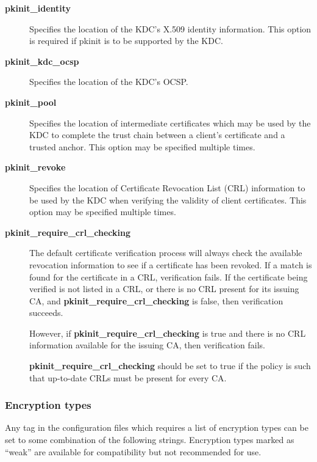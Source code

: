 \documentclass[letterpaper,10pt,english]{sphinxmanual}
\begin{document}
\begin{description}
\begin{description}
\end{description}

\item[{\textbf{pkinit\_identity}}] \leavevmode
Specifies the location of the KDC's X.509 identity information.
This option is required if pkinit is to be supported by the KDC.

\item[{\textbf{pkinit\_kdc\_ocsp}}] \leavevmode
Specifies the location of the KDC's OCSP.

\item[{\textbf{pkinit\_pool}}] \leavevmode
Specifies the location of intermediate certificates which may be
used by the KDC to complete the trust chain between a client's
certificate and a trusted anchor.  This option may be specified
multiple times.

\item[{\textbf{pkinit\_revoke}}] \leavevmode
Specifies the location of Certificate Revocation List (CRL)
information to be used by the KDC when verifying the validity of
client certificates.  This option may be specified multiple times.

\item[{\textbf{pkinit\_require\_crl\_checking}}] \leavevmode
The default certificate verification process will always check the
available revocation information to see if a certificate has been
revoked.  If a match is found for the certificate in a CRL,
verification fails.  If the certificate being verified is not
listed in a CRL, or there is no CRL present for its issuing CA,
and \textbf{pkinit\_require\_crl\_checking} is false, then verification
succeeds.

However, if \textbf{pkinit\_require\_crl\_checking} is true and there is
no CRL information available for the issuing CA, then verification
fails.

\textbf{pkinit\_require\_crl\_checking} should be set to true if the
policy is such that up-to-date CRLs must be present for every CA.

\end{description}


\subsubsection{Encryption types}
\label{admin/conf_files/kdc_conf:id6}\label{admin/conf_files/kdc_conf:encryption-types}
Any tag in the configuration files which requires a list of encryption
types can be set to some combination of the following strings.
Encryption types marked as ``weak'' are available for compatibility but
not recommended for use.
\end{document}
